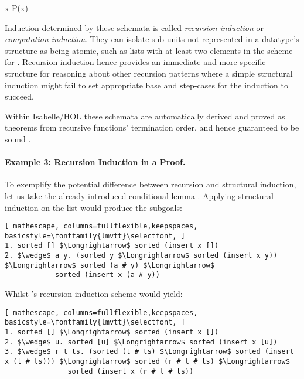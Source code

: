   {\forall x \;\; P\;(x)}

\vspace{2 mm}

Induction determined by these schemata is called \emph{recursion induction} or \emph{computation induction}.
%
They can isolate sub-units not represented in a datatype's structure as being atomic, such as lists with at least two elements in the scheme for .
%
Recursion induction hence provides an immediate and more specific structure for reasoning about other recursion patterns where a simple structural induction might fail to set appropriate base and step-cases for the induction to succeed.

Within Isabelle/HOL these schemata are automatically derived and proved as theorems from recursive functions' termination order, and hence guaranteed to be sound \cite{krauss-term}. 


\paragraph*{Example 3: Recursion Induction in a Proof.}


To exemplify the potential difference between recursion and structural induction, let us take the already introduced conditional lemma .
%
Applying structural induction on the list  would produce the subgoals:

\begin{lstlisting}[ mathescape, columns=fullflexible,keepspaces, basicstyle=\fontfamily{lmvtt}\selectfont, ]
1. sorted [] $\Longrightarrow$ sorted (insert x [])
2. $\wedge$ a y. (sorted y $\Longrightarrow$ sorted (insert x y)) $\Longrightarrow$ sorted (a # y) $\Longrightarrow$
            sorted (insert x (a # y))
\end{lstlisting}

\noindent Whilst 's recursion induction scheme would yield:

\begin{lstlisting}[ mathescape, columns=fullflexible,keepspaces, basicstyle=\fontfamily{lmvtt}\selectfont, ]
1. sorted [] $\Longrightarrow$ sorted (insert x [])
2. $\wedge$ u. sorted [u] $\Longrightarrow$ sorted (insert x [u])
3. $\wedge$ r t ts. (sorted (t # ts) $\Longrightarrow$ sorted (insert x (t # ts))) $\Longrightarrow$ sorted (r # t # ts) $\Longrightarrow$
               sorted (insert x (r # t # ts))
\end{lstlisting}

